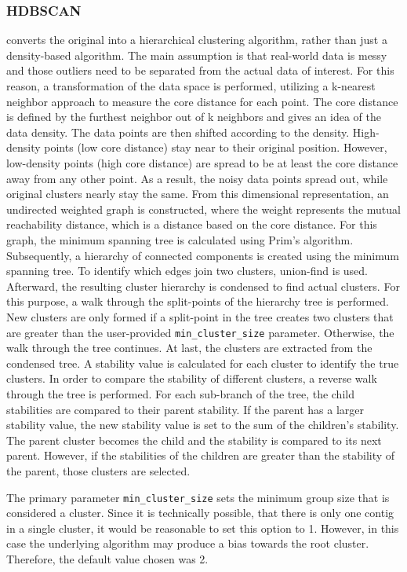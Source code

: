 \documentclass[12pt,a4paper,english]{article}
\begin{document}
	\subsubsection*{HDBSCAN}
    \hdbscan converts the original \dbscan \citep{dbscan:96} into a hierarchical clustering algorithm, rather than just a density-based algorithm.
	The main assumption is that real-world data is messy and those outliers need to be separated from the actual data of interest. For this reason, a transformation of the data space is performed, utilizing a k-nearest neighbor approach to measure the core distance for each point. The core distance is defined by the furthest neighbor out of k neighbors and gives an idea of the data density. The data points are then shifted according to the density. High-density points (low core distance) stay near to their original position. However, low-density points (high core distance) are spread to be at least the core distance away from any other point. As a result, the noisy data points spread out, while original clusters nearly stay the same.
	From this dimensional representation, an undirected weighted graph is constructed, where the weight represents the mutual reachability distance, which is a distance based on the core distance. For this graph, the minimum spanning tree is calculated using Prim's algorithm.
	Subsequently, a hierarchy of connected components is created using the minimum spanning tree. To identify which edges join two clusters, union-find is used.
	Afterward, the resulting cluster hierarchy is condensed to find actual clusters. For this purpose, a walk through the split-points of the hierarchy tree is performed. New clusters are only formed if a split-point in the tree creates two clusters that are greater than the user-provided \texttt{min\_cluster\_size} parameter. Otherwise, the walk through the tree continues.
	At last, the clusters are extracted from the condensed tree. A stability value is calculated for each cluster to identify the true clusters. In order to compare the stability of different clusters, a reverse walk through the tree is performed. For each sub-branch of the tree, the child stabilities are compared to their parent stability. If the parent has a larger stability value, the new stability value is set to the sum of the children's stability. The parent cluster becomes the child and the stability is compared to its next parent.
	However, if the stabilities of the children are greater than the stability of the parent, those clusters are selected.

	The primary parameter \texttt{min\_cluster\_size} sets the minimum group size that is considered a cluster. Since it is technically possible, that there is only one contig in a single cluster, it would be reasonable to set this option to 1. However, in this case the underlying algorithm may produce a bias towards the root cluster. Therefore, the default value chosen was 2.
	
\end{document}
